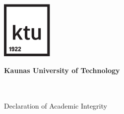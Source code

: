 
\begin{titlepage}
   
   
   \begin{center}
        
        
        
        
        \vspace*{0.3cm}
        \includegraphics[width=2.46cm]{images/ktu-ikona.pdf}
        \vspace{0.3cm}

       \textbf{Kaunas University of Technology}
        \\ \projectFaculty
        \\ \projectAuthorName
        
        \vspace{2cm}
        
       \LARGE
	\textbf{\expandafter\capitalisewords\expandafter{\projectTitle}} \\
        \large
        Declaration of Academic Integrity        	       
               

       \vspace{1cm}
       \end{center}


\end{titlepage}
